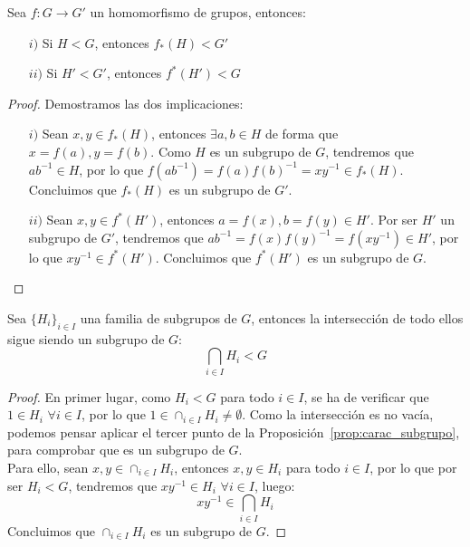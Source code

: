\begin{prop}
    Sea $f:G\to G'$ un homomorfismo de grupos, entonces: 
    \begin{enumerate}
        \item[$i)$] Si $H<G$, entonces $f_\ast(H)< G'$ 
        \item[$ii)$] Si $H'<G'$, entonces $f^\ast(H')< G$
    \end{enumerate}
    \begin{proof}
        Demostramos las dos implicaciones:
        \begin{enumerate}
            \item[$i)$] Sean $x,y\in f_\ast(H)$, entonces $\exists a,b\in H$ de forma que $x=f(a), y=f(b)$. Como $H$ es un subgrupo de $G$, tendremos que $ab^{-1}\in H$, por lo que $f(ab^{-1}) = f(a){f(b)}^{-1} = xy^{-1}\in f_\ast(H)$. Concluimos que $f_\ast(H)$ es un subgrupo de $G'$.
            \item[$ii)$] Sean $x,y\in f^\ast(H')$, entonces $a=f(x), b=f(y)\in H'$. Por ser $H'$ un subgrupo de $G'$, tendremos que $ab^{-1} = f(x){f(y)}^{-1}=f(xy^{-1})\in H'$, por lo que ${xy^{-1}\in f^\ast(H')}$. Concluimos que $f^\ast(H')$ es un subgrupo de $G$.
        \end{enumerate}
    \end{proof}
\end{prop}

\begin{prop}
    Sea $\{H_i\}_{i \in I}$ una familia de subgrupos de $G$, entonces la intersección de todo ellos sigue siendo un subgrupo de $G$:
    \begin{equation*}
        \bigcap_{i \in I} H_i < G
    \end{equation*}
    \begin{proof}
        En primer lugar, como $H_i < G$ para todo $i \in I$, se ha de verificar que $1\in H_i$ $\forall i \in I$, por lo que $1\in \cap_{i \in I} H_i \neq \emptyset $. Como la intersección es no vacía, podemos pensar aplicar el tercer punto de la Proposición~\ref{prop:carac_subgrupo}, para comprobar que es un subgrupo de $G$.\\

        \noindent
        Para ello, sean $x,y\in \cap_{i \in I}H_i$, entonces $x,y\in H_i$ para todo $i \in I$, por lo que por ser $H_i < G$, tendremos que $xy^{-1}\in H_i$ $\forall i \in I$, luego:
        \begin{equation*}
            xy^{-1} \in \bigcap_{i \in I}H_i
        \end{equation*}
        Concluimos que $\cap_{i \in I}H_i$ es un subgrupo de $G$.
    \end{proof}
\end{prop}

